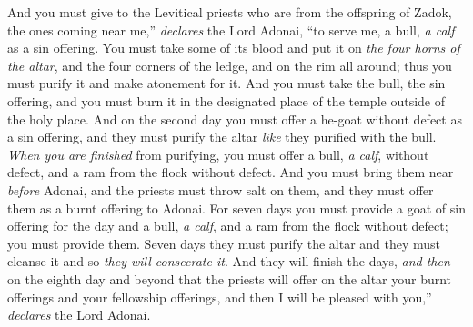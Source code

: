 \begin{biblechapter}
\verse And you must give to the Levitical priests who are from the offspring of Zadok, the ones coming near me,” \textit{declares} the Lord Adonai, “to serve me, a bull, \textit{a calf} as a sin offering.
\verse You must take some of its blood and put it on \textit{the four horns of the altar}, and the four corners of the ledge, and on the rim all around; thus you must purify it and make atonement for it.
\verse And you must take the bull, the sin offering, and you must burn it in the designated place of the temple outside of the holy place.
\verse And on the second day you must offer a he-goat without defect as a sin offering, and they must purify the altar \textit{like} they purified with the bull.
\verse \textit{When you are finished} from purifying, you must offer a bull, \textit{a calf}, without defect, and a ram from the flock without defect.
\verse And you must bring them near \textit{before} Adonai, and the priests must throw salt on them, and they must offer them as a burnt offering to Adonai.
\verse For seven days you must provide a goat of sin offering for the day and a bull, \textit{a calf}, and a ram from the flock without defect; you must provide them.
\verse Seven days they must purify the altar and they must cleanse it and so \textit{they will consecrate it}.
\verse And they will finish the days, \textit{and then} on the eighth day and beyond that the priests will offer on the altar your burnt offerings and your fellowship offerings, and then I will be pleased with you,” \textit{declares} the Lord Adonai.
\end{biblechapter}

